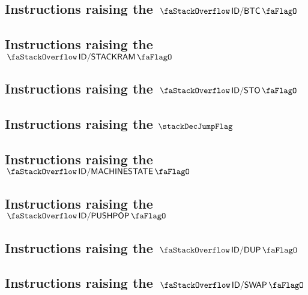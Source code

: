 \subsection{Instructions raising the $\stackDecBtcFlag$           \lispDone{}}   \label{hub: instruction handling: btc}                    
\subsection{Instructions raising the $\stackDecStackRamFlag$      \lispDone{}}   \label{hub: instruction handling: stackRam}               
\subsection{Instructions raising the $\stackDecStoFlag$           \lispDone{}}   \label{hub: instruction handling: sto}                    
\subsection{Instructions raising the $\stackDecJumpFlag$          \lispDone{}}   \label{hub: instruction handling: jump}                   
\subsection{Instructions raising the $\stackDecMachineStateFlag$  \lispDone{}}   \label{hub: instruction handling: machineState}           
\subsection{Instructions raising the $\stackDecPushPopFlag$       \lispDone{}}   \label{hub: instruction handling: pushPop}                
\subsection{Instructions raising the $\stackDecDupFlag$           \lispDone{}}   \label{hub: instruction handling: dup}                    
\subsection{Instructions raising the $\stackDecSwapFlag$          \lispDone{}}   \label{hub: instruction handling: swap}                   
